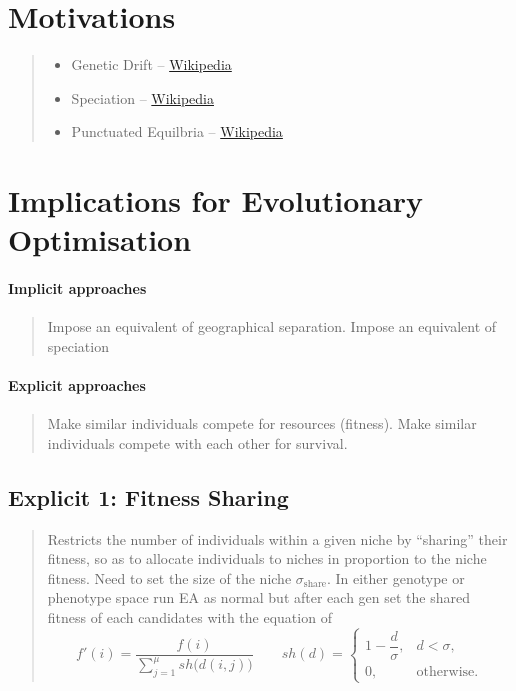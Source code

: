 \documentclass[a4paper, 11pt]{article}
\begin{document}
\section{Motivations}
    \begin{quote}
        \begin{itemize}
            \item Genetic Drift -- \href{https://en.wikipedia.org/wiki/Genetic_drift}{Wikipedia}
            \item Speciation -- \href{https://en.wikipedia.org/wiki/Speciation}{Wikipedia}
            \item Punctuated Equilbria -- \href{https://en.wikipedia.org/wiki/Punctuated_equilibrium}{Wikipedia}
        \end{itemize}
    \end{quote}
\section{Implications for Evolutionary Optimisation}
\paragraph{Implicit approaches}
    \begin{quote}
        Impose an equivalent of geographical separation. Impose an equivalent of speciation
    \end{quote}
\paragraph{Explicit approaches}
    \begin{quote}
        Make similar individuals compete for resources (fitness). Make similar individuals compete with each other for survival.
    \end{quote}
\subsection{Explicit 1: Fitness Sharing}
    \begin{quote}
        Restricts the number of individuals within a given niche by ``sharing'' their fitness, so as to allocate individuals to niches in proportion to the 
        niche fitness. Need to set the size of the niche $\sigma_{\text{share}}$. In either genotype or phenotype space run EA as normal but after each gen 
        set the shared fitness of each candidates with the equation of
        \begin{equation*}
            f'(i) = \frac{f(i)}{\displaystyle\sum_{j=1}^{\mu} sh\bigl(d(i,j)\bigr)}
            \qquad sh(d) =
            \begin{cases}
                1 - \dfrac{d}{\sigma}, & d < \sigma,\\[6pt]
                0, & \text{otherwise.}
            \end{cases} 
        \end{equation*}
    \end{quote}
\end{document}
